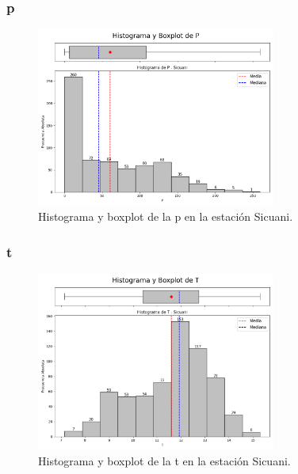 \subsubsection*{\gls{p} }
\begin{figure}[htbp]
\centering
\includegraphics[width=0.7\textwidth]{resultados/por_estacion_meteorologica/Sicuani/P_histograma.png}
\caption{Histograma y boxplot de la \gls{p}  en la estación Sicuani.}
\label{fig:sicuani_P}
\end{figure}

\subsubsection*{\gls{t} }
\begin{figure}[htbp]
\centering
\includegraphics[width=0.7\textwidth]{resultados/por_estacion_meteorologica/Sicuani/T_histograma.png}
\caption{Histograma y boxplot de la \gls{t}  en la estación Sicuani.}
\label{fig:sicuani_T}
\end{figure}

